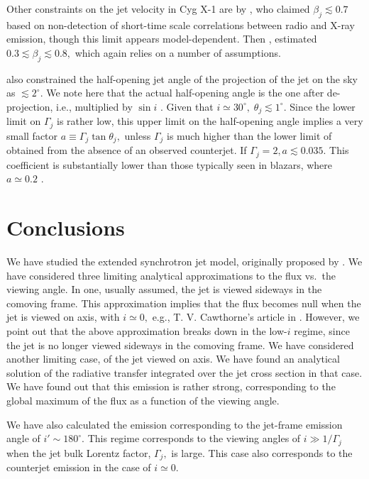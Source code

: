 Other constraints on the jet velocity in Cyg X-1 are by \citealt{Gleissner_et_al.-2004-A&A}, who claimed $ \beta_j \lesssim 0.7 $ based on non-detection of short-time scale correlations between radio and X-ray emission, though this limit appears model-dependent. Then \citealt{Malzac_Belmont_Fabian-2009-MNRAS}, estimated $ 0.3 \lesssim \beta_j \lesssim 0.8 , $ which again relies on a number of assumptions.

\citealt{Stirling_et_al.-2001-MNRAS} also constrained the half-opening jet angle of the projection of the jet on the sky as $ \lesssim 2^{\circ} . $ We note here that the actual half-opening angle is the one after de-projection, i.e., multiplied by $\sin i$ \citep{Konigl-1981-ApJ}. Given that $ i \simeq 30 ^{\circ} , \; \theta_j \lesssim 1 ^{\circ} . $ Since the lower limit on $ \Gamma_j $ is rather low, this upper limit on the half-opening angle implies a very small factor $ a \equiv \Gamma_j \tan \theta_j , $ unless $ \Gamma_j $ is much higher than the lower limit of \citealt{Stirling_et_al.-2001-MNRAS} obtained from the absence of an observed counterjet. If $ \Gamma_j = 2 , a \lesssim 0.035 . $ This coefficient is substantially lower than those typically seen in blazars, where $ a \simeq 0.2 $ \citep{Clausen-Brown_et_al.-2013-A&A}.


\section{Conclusions} \label{sec:conclusions}

We have studied the extended synchrotron jet model, originally proposed by \citealt{Blandford_&_Konigl-1979-ApJ}. We have considered three limiting analytical approximations to the flux vs.\ the viewing angle. In one, usually assumed, the jet is viewed sideways in the comoving frame. This approximation implies that the flux becomes null when the jet is viewed on axis, with $ i \simeq 0 , $ e.g., T. V. Cawthorne's article in \citealt{Beams_and_jets}. However, we point out that the above approximation breaks down in the low-$ i $ regime, since the jet is no longer viewed sideways in the comoving frame. We have considered another limiting case, of the jet viewed on axis. We have found an analytical solution of the radiative transfer integrated over the jet cross section in that case. We have found out that this emission is rather strong, corresponding to the global maximum of the flux as a function of the viewing angle. 

We have also calculated the emission corresponding to the jet-frame emission angle of $ i' \sim 180^{\circ} .$ This regime corresponds to the viewing angles of $ i \gg 1/\Gamma_j $ when the jet bulk Lorentz factor, $ \Gamma_j , $ is large. This case also corresponds to the counterjet emission in the case of $ i \simeq 0 . $

